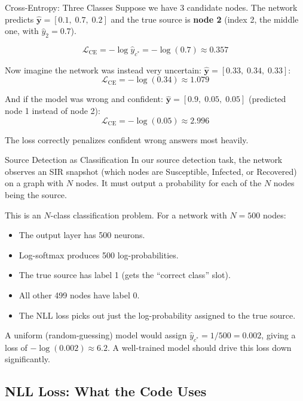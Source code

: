 \begin{examplebox}{Cross-Entropy: Three Classes}
Suppose we have 3 candidate nodes. The network predicts $\hat{\mathbf{y}} = [0.1,\; 0.7,\; 0.2]$ and the true source is \textbf{node 2} (index 2, the middle one, with $\hat{y}_2 = 0.7$).

\[
    \mathcal{L}_{\text{CE}} = -\log \hat{y}_{c^*} = -\log(0.7) \approx \mathbf{0.357}
\]

Now imagine the network was instead very uncertain: $\hat{\mathbf{y}} = [0.33,\; 0.34,\; 0.33]$:
\[
    \mathcal{L}_{\text{CE}} = -\log(0.34) \approx \mathbf{1.079}
\]

And if the model was wrong and confident: $\hat{\mathbf{y}} = [0.9,\; 0.05,\; 0.05]$ (predicted node 1 instead of node 2):
\[
    \mathcal{L}_{\text{CE}} = -\log(0.05) \approx \mathbf{2.996}
\]

The loss correctly penalizes confident wrong answers most heavily.
\end{examplebox}

\begin{examplebox}{Source Detection as Classification}
In our source detection task, the network observes an SIR snapshot (which nodes are Susceptible, Infected, or Recovered) on a graph with $N$ nodes. It must output a probability for each of the $N$ nodes being the source.

This is an $N$-class classification problem. For a network with $N = 500$ nodes:
\begin{itemize}
    \item The output layer has 500 neurons.
    \item Log-softmax produces 500 log-probabilities.
    \item The true source has label 1 (gets the ``correct class'' slot).
    \item All other 499 nodes have label 0.
    \item The NLL loss picks out just the log-probability assigned to the true source.
\end{itemize}

A uniform (random-guessing) model would assign $\hat{y}_{c^*} = 1/500 = 0.002$, giving a loss of $-\log(0.002) \approx 6.2$. A well-trained model should drive this loss down significantly.
\end{examplebox}

\subsection{NLL Loss: What the Code Uses}

